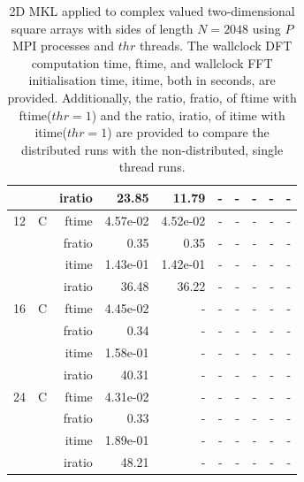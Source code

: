 \documentclass[a4paper]{article}
\begin{document}
\begin{table}[htbp]
\begin{center}
\begin{small}
\begin{tabular}{|r|r|r|r|r|r|r|r|r|r|}
          &      & iratio & 23.85 & 11.79 &     -     &     -     &     -     &     -     &     -     \\ \hline 
     12 & C & ftime & 4.57e-02 & 4.52e-02 &     -     &     -     &     -     &     -     &     -     \\   
          &      & fratio & 0.35 & 0.35 &     -     &     -     &     -     &     -     &     -     \\   
          &      & itime & 1.43e-01 & 1.42e-01 &     -     &     -     &     -     &     -     &     -     \\   
          &      & iratio & 36.48 & 36.22 &     -     &     -     &     -     &     -     &     -     \\ \hline 
     16 & C & ftime & 4.45e-02 &     -     &     -     &     -     &     -     &     -     &     -     \\   
          &      & fratio & 0.34 &     -     &     -     &     -     &     -     &     -     &     -     \\   
          &      & itime & 1.58e-01 &     -     &     -     &     -     &     -     &     -     &     -     \\   
          &      & iratio & 40.31 &     -     &     -     &     -     &     -     &     -     &     -     \\ \hline 
     24 & C & ftime & 4.31e-02 &     -     &     -     &     -     &     -     &     -     &     -     \\   
          &      & fratio & 0.33 &     -     &     -     &     -     &     -     &     -     &     -     \\   
          &      & itime & 1.89e-01 &     -     &     -     &     -     &     -     &     -     &     -     \\   
          &      & iratio & 48.21 &     -     &     -     &     -     &     -     &     -     &     -     \\ \hline 

\end{tabular}
\caption{2D MKL applied to complex valued two-dimensional square arrays with sides of length $N=2048$ using $P$ MPI processes and $thr$ threads. The wallclock DFT computation time, ftime, and wallclock FFT initialisation time, itime, both in seconds, are provided. Additionally, the ratio, fratio, of ftime  with ftime($thr=1$) and the ratio, iratio, of itime  with itime($thr=1$) are provided to compare the distributed runs with the non-distributed, single thread runs.  }\label{TblMKL2d2048c}
\end{small}
\end{center}
\end{table}
\end{document}

